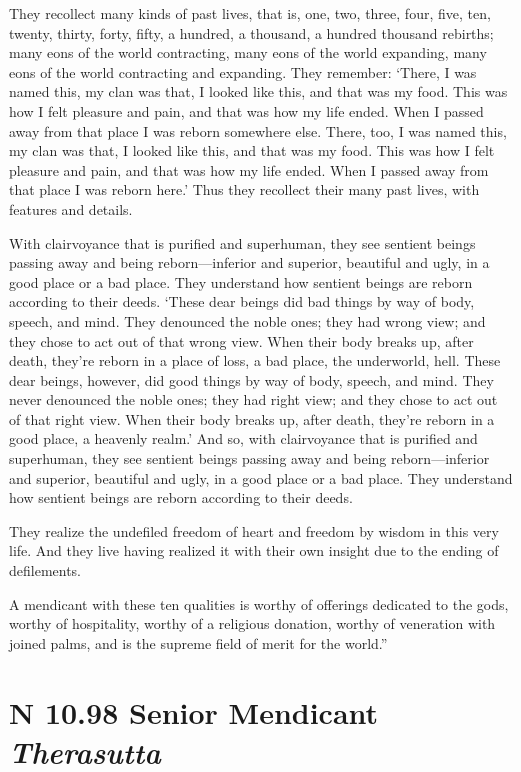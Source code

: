 \documentclass[12pt,openany]{book}%
\newcommand*{\suttatitleacronym}[1]{\smaller[2]{#1}\vspace*{.3em}}
\newcommand*{\suttatitletranslation}[1]{\linebreak{#1}}
\newcommand*{\suttatitleroot}[1]{\linebreak\smaller[2]\itshape{#1}}
\newcommand*{\tocacronym}[1]{\hspace*{-3.3em}{#1}\quad}
\newcommand*{\toctranslation}[1]{#1}
\newcommand*{\tocroot}[1]{(\textit{#1})}
\begin{document}
They recollect many kinds of past lives, that is, one, two, three, four, five, ten, twenty, thirty, forty, fifty, a hundred, a thousand, a hundred thousand rebirths; many eons of the world contracting, many eons of the world expanding, many eons of the world contracting and expanding. They remember: ‘There, I was named this, my clan was that, I looked like this, and that was my food. This was how I felt pleasure and pain, and that was how my life ended. When I passed away from that place I was reborn somewhere else. There, too, I was named this, my clan was that, I looked like this, and that was my food. This was how I felt pleasure and pain, and that was how my life ended. When I passed away from that place I was reborn here.’ Thus they recollect their many past lives, with features and details. 

With clairvoyance that is purified and superhuman, they see sentient beings passing away and being reborn—inferior and superior, beautiful and ugly, in a good place or a bad place. They understand how sentient beings are reborn according to their deeds. ‘These dear beings did bad things by way of body, speech, and mind. They denounced the noble ones; they had wrong view; and they chose to act out of that wrong view. When their body breaks up, after death, they’re reborn in a place of loss, a bad place, the underworld, hell. These dear beings, however, did good things by way of body, speech, and mind. They never denounced the noble ones; they had right view; and they chose to act out of that right view. When their body breaks up, after death, they’re reborn in a good place, a heavenly realm.’ And so, with clairvoyance that is purified and superhuman, they see sentient beings passing away and being reborn—inferior and superior, beautiful and ugly, in a good place or a bad place. They understand how sentient beings are reborn according to their deeds. 

They realize the undefiled freedom of heart and freedom by wisdom in this very life. And they live having realized it with their own insight due to the ending of defilements. 

A mendicant with these ten qualities is worthy of offerings dedicated to the gods, worthy of hospitality, worthy of a religious donation, worthy of veneration with joined palms, and is the supreme field of merit for the world.” 

%
\section*{{\suttatitleacronym AN 10.98}{\suttatitletranslation A Senior Mendicant }{\suttatitleroot Therasutta}}
\addcontentsline{toc}{section}{\tocacronym{AN 10.98} \toctranslation{A Senior Mendicant } \tocroot{Therasutta}}
\end{document}
